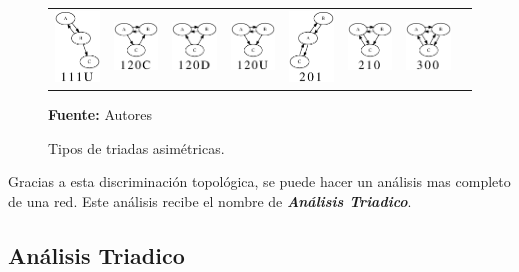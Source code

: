 \begin{figure}[!htb]
\begin{center}
\begin{tabular}{m{1.3cm}|m{1.3cm}|m{1.3cm}|m{1.3cm}|m{1.3cm}|m{1.3cm}|m{1.3cm}|m{1.3cm}}
        \includegraphics[width=1.3cm]{./imagenes/triada_111U.eps} & 
        \includegraphics[width=1.3cm]{./imagenes/triada_120C.eps} & 
        \includegraphics[width=1.3cm]{./imagenes/triada_120D.eps} & 
        \includegraphics[width=1.3cm]{./imagenes/triada_120U.eps} & 
        \includegraphics[width=1.3cm]{./imagenes/triada_201.eps} & 
        \includegraphics[width=1.3cm]{./imagenes/triada_210.eps} & 
        \includegraphics[width=1.3cm]{./imagenes/triada_300.eps}\\
      \end{tabular}
    \caption{Tipos de triadas asimétricas.}
    \label{fig:tipos_triadas_asimetricas}
    \textbf{Fuente:}  Autores
  \end{center}
\end{figure}


Gracias a esta discriminación topológica, se puede hacer un análisis mas completo de una red. Este análisis recibe el nombre de \textbf{\textit{Análisis Triadico}}.

\subsection{Análisis Triadico}


